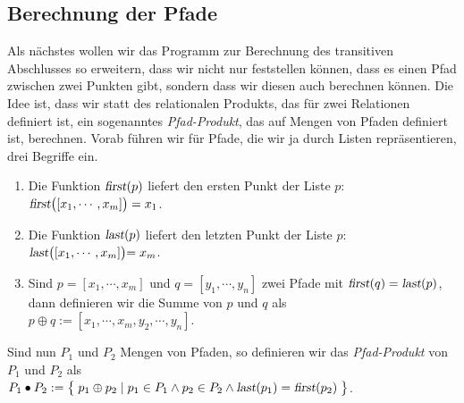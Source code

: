 \subsection{Berechnung der Pfade}
Als nächstes wollen wir das Programm zur Berechnung des transitiven Abschlusses so
erweitern, dass wir nicht nur feststellen können, dass es einen Pfad zwischen zwei Punkten
gibt, sondern dass wir diesen auch berechnen können.  Die Idee ist, dass wir statt des
relationalen Produkts, das für zwei Relationen definiert ist, ein sogenanntes
\emph{Pfad-Produkt}, das auf Mengen von Pfaden definiert ist, berechnen.  Vorab führen wir
für Pfade, die wir ja durch Listen repräsentieren,
drei Begriffe ein.
\begin{enumerate}
\item Die Funktion $\textsl{first}(p)$ liefert den ersten Punkt der Liste $p$: \\[0.2cm]
      \hspace*{1.3cm} $\textsl{first}\bigl([x_1,\cdots,x_m]\bigr) = x_1$.
\item Die Funktion $\textsl{last}(p)$ liefert den letzten Punkt der Liste $p$: \\[0.2cm]
      \hspace*{1.3cm} $\textsl{last}\bigl([x_1,\cdots,x_m]\bigl) = x_m$.
\item Sind $p = [ x_1, \cdots, x_m ]$ und $q =[ y_1, \cdots, y_n ]$ 
      zwei Pfade mit $\textsl{first}(q) = \textsl{last}(p)$, dann definieren wir 
      die Summe von $p$ und $q$       als \\[0.2cm]
      \hspace*{1.3cm}
      $p \oplus q := [x_1, \cdots, x_m, y_2, \cdots, y_n ]$.
\end{enumerate}
Sind nun $P_1$ und $P_2$ Mengen von Pfaden, so definieren wir das  \emph{Pfad-Produkt} von
$P_1$ und $P_2$ als \\[0.2cm]
\hspace*{1.3cm} 
$P_1 \bullet P_2 := \bigl\{\; p_1 \oplus p_2 \mid p_1 \in P_1 \wedge p_2 \in P_2 \wedge \textsl{last}(p_1) = \textsl{first}(p_2) \;\bigr\}$.

